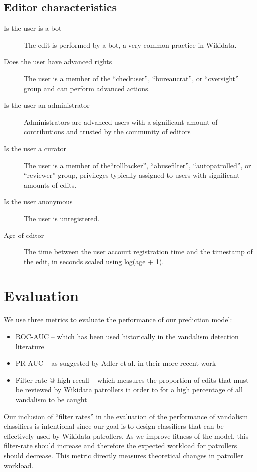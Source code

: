\documentclass{sig-alternate}
\begin{document}
\subsection{Editor characteristics}
\begin{description}
\item[Is the user is a bot]  The edit is performed by a bot, a very common practice in Wikidata.
\item[Does the user have advanced rights]  The user is a member of the ``checkuser'', ``bureaucrat'', or ``oversight'' group and can perform advanced actions.
\item[Is the user an administrator] Administrators are advanced users with a significant amount of contributions and trusted by the community of editors
\item[Is the user a curator]  The user is a member of the``rollbacker'', ``abusefilter'', ``autopatrolled'', or ``reviewer'' group, privileges typically assigned to users with significant amounts of edits.
\item[Is the user anonymous]  The user is unregistered.
\item[Age of editor] The time between the user account registration time and the timestamp of the edit, in seconds scaled using log(age + 1).
\end{description}

\section{Evaluation}
We use three metrics to evaluate the performance of our prediction model:
\begin{itemize}
\item ROC-AUC -- which has been used historically in the vandalism detection literature\cite{adler:detecting, wang:got}
\item PR-AUC -- as suggested by Adler et al. in their more recent work\cite{adler:wikipedia}
\item Filter-rate @ high recall -- which measures the proportion of edits that must be reviewed by Wikidata patrollers in order to for a high percentage of all vandalism to be caught
\end{itemize}

Our inclusion of ``filter rates'' in the evaluation of the performance of vandalism classifiers is intentional since our goal is to design classifiers that can be effectively used by Wikidata patrollers.  As we improve fitness of the model, this filter-rate should increase and therefore the expected workload for patrollers should decrease. This metric directly measures theoretical changes in patroller workload.
\end{document}
